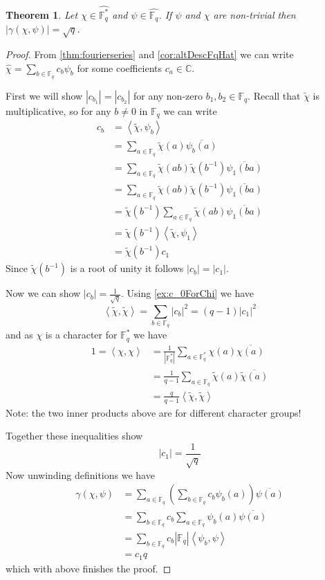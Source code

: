 \documentclass[11pt]{article}
\newcommand{\BB}[1]{\mathbb{#1}} %
\newcommand{\free}[1]{\left\langle#1\right\rangle} %
\newcommand{\CC}{\BB{C}}
\newcommand{\FF}{\BB{F}}
\renewcommand{\hat}{\widehat}
\theoremstyle{plain}
\newtheorem{thm}[theoremCounter]{Theorem}
\theoremstyle{definition}
\theoremstyle{remark}
\begin{document}
\begin{thm}\label{thm:gausssumsqtq}
	Let $\chi\in\hat{\FF_q^*}$ and $\psi\in\hat{\FF_q}$. If $\psi$ and $\chi$ are non-trivial then $\left|\gamma(\chi,\psi)\right| = \sqrt{q}$.
\end{thm}
\begin{proof}
	From \autoref{thm:fourierseries} and \autoref{cor:altDescFqHat} we can write $\widehat{\chi} = \sum_{b\in\FF_q}c_b\psi_b$ for some coefficients $c_a\in\CC$.

	First we will show $|c_{b_1}| = |c_{b_2}|$ for any non-zero $b_1,b_2\in\FF_q$. Recall that $\widetilde{\chi}$ is multiplicative, so for any $b\neq 0$ in $\FF_q$ we can write
	\begin{align*}
		c_b
		&= \free{\widetilde{\chi},\psi_b}
		\\
		&= \sum_{a\in\FF_q}\widetilde{\chi}(a)\overline{\psi_b(a)}
		\\
		&= \sum_{a\in\FF_q}\widetilde{\chi}(ab)\widetilde{\chi}(b^{-1})\overline{\psi_1(ba)}
		\\
		&= \sum_{a\in\FF_q}\widetilde{\chi}(ab)\widetilde{\chi}(b^{-1})\overline{\psi_1(ba)}
		\\
		&= \widetilde{\chi}(b^{-1})\sum_{a\in\FF_q}\widetilde{\chi}(ab)\overline{\psi_1(ba)}
		\\
		&= \widetilde{\chi}(b^{-1})\free{\widetilde{\chi},\psi_1}
		\\
		&= \widetilde{\chi}(b^{-1})c_1
	\end{align*}
	Since $\widetilde{\chi}(b^{-1})$ is a root of unity it follows $|c_b| = |c_1|$.


	Now we can show $|c_b| = \frac{1}{\sqrt{q}}$. Using \autoref{ex:c_0ForChi} we have
	$$
	\free{\widetilde{\chi},\widetilde{\chi}} = \sum_{b\in\FF_q} |c_b|^2 = (q-1)|c_1|^2
	$$
	and as $\chi$ is a character for $\FF_q^*$ we have
	\begin{align*}
		1 = \free{\chi,\chi}
		&= \frac{1}{|\FF_q^*|}\sum_{a\in\FF_q^*}\chi(a)\overline{\chi(a)}
		\\
		&= \frac{1}{q-1}\sum_{a\in\FF_q}\widetilde{\chi}(a)\overline{\widetilde{\chi}(a)}
		\\
		&= \frac{q}{q-1}\free{\widetilde{\chi},\widetilde{\chi}}
	\end{align*}
	Note: the two inner products above are for different character groups!

	Together these inequalities show
	$$
	|c_1| = \frac{1}{\sqrt{q}}
	$$
	\noindent
	Now unwinding definitions we have
	\begin{align*}
		\gamma(\chi,\psi)
		&= \sum_{a\in\FF_q}\left(\sum_{b\in\FF_q}c_b\psi_b(a)\right)\overline{\psi(a)}
		\\
		&= \sum_{b\in\FF_q}c_b\sum_{a\in\FF_q}\psi_b(a)\overline{\psi(a)}
		\\
		&= \sum_{b\in\FF_q}c_b|\FF_q|\free{\psi_b,\psi}
		\\
		&=
		c_1q
	\end{align*}
	which with above finishes the proof.
\end{proof}
\end{document}
